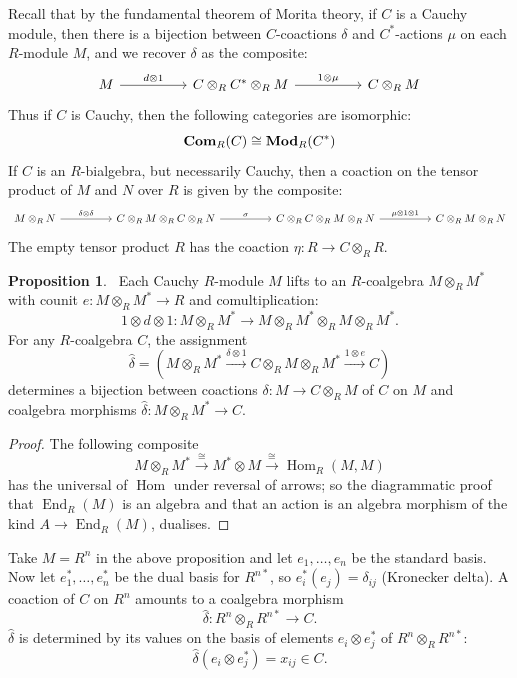 \documentclass[8pt]{article}
\theoremstyle{definition}
\theoremstyle{definition}
\theoremstyle{definition}
\theoremstyle{definition}
\theoremstyle{definition}
\theoremstyle{definition}
\theoremstyle{definition}
\newtheorem{prop}{Proposition}[section]
\theoremstyle{definition}
\theoremstyle{definition}
\theoremstyle{definition}
\theoremstyle{definition}
\theoremstyle{definition}
\theoremstyle{definition}
\theoremstyle{definition}
\theoremstyle{question}
\begin{document}
Recall that by the fundamental theorem of Morita theory, if $C$ is a Cauchy module, then there is a bijection between $C$-coactions $\delta$
and $C^*$-actions $\mu$ on each $R$-module $M$, and we recover $\delta$ as the composite:
\[
\begin{tikzcd}
  M \ar[rr, "d \otimes 1"] && C \otimes_R C^* \otimes_R M \ar[rr, "1 \otimes \mu"] && C \otimes_R M
\end{tikzcd}
\]
Thus if $C$ is Cauchy, then the following categories are isomorphic:
\[
{\bf Com}_R(C) \cong {\bf Mod}_R(C^*)
\]
If $C$ is an $R$-bialgebra, but necessarily Cauchy, then a coaction on the tensor product of $M$ and $N$ over $R$ is given by the composite:
\[
\begin{tikzcd}
  M \otimes_R N \ar[rr, "\delta \otimes \delta"] && C \otimes_R M \otimes_R  C \otimes_R N \ar[rr, "\sigma"] && C \otimes_R C \otimes_R M \otimes_R N \ar[rr, "\mu \otimes 1 \otimes 1"] && C \otimes_R M \otimes_R N
\end{tikzcd}
\] 
The empty tensor product $R$ has the coaction $\eta : R \to C \otimes_R R$.

\begin{prop}~\label{repres:exer}
  Each Cauchy $R$-module $M$ lifts to an $R$-coalgebra $M \otimes_R M^*$ with counit $e : M \otimes_R M^* \to R$ and comultiplication:
  \[
  1 \otimes d \otimes 1 : M \otimes_R M^* \to M \otimes_R M^* \otimes_R M \otimes_R M^*.
  \]
  For any $R$-coalgebra $C$, the assignment
  \[
  \hat{\delta} = (M \otimes_R M^* \xrightarrow{\delta \otimes 1} C \otimes_R M \otimes_R M^* \xrightarrow{1 \otimes e} C)
  \]
  determines a bijection between coactions $\delta : M \to C \otimes_R M$ of $C$ on $M$ and coalgebra morphisms $\hat{\delta} : M \otimes_R M^* \to C$.
\end{prop}

\begin{proof}
  The following composite
  \[
  M \otimes_R M^* \xrightarrow{\cong} M^* \otimes M \xrightarrow{\cong} \operatorname{Hom}_R(M, M)
  \]
  has the universal of $\operatorname{Hom}$ under reversal of arrows; so the diagrammatic proof that $\operatorname{End}_R(M)$ is
  an algebra and that an action is an algebra morphism of the kind $A \to \operatorname{End}_R(M)$, dualises.
\end{proof}

Take $M = R^n$ in the above proposition and let $e_1, \ldots, e_n$ be the standard basis. Now let $e^*_1, \ldots, e^*_n$ be the dual 
basis for $R^{n*}$, so $e^*_i(e_j) = \delta_{ij}$ (Kronecker delta). A coaction of $C$ on $R^n$ amounts to a coalgebra morphism
\[
\hat{\delta} : R^n \otimes_R R^{n*} \to C.
\]
$\hat{\delta}$ is determined by its values on the basis of elements $e_i \otimes e^*_j$ of $R^n \otimes_R R^{n*}$:
\[
\hat{\delta}(e_i \otimes e^*_j) = x_{ij} \in C.
\]
\end{document}
